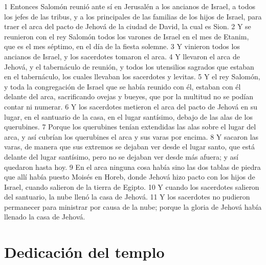 1 Entonces Salomón reunió ante sí en Jerusalén a los ancianos de Israel, a todos los jefes de las tribus, y a los principales de las familias de los hijos de Israel, para traer el arca del pacto de Jehová de la ciudad de David, la cual es Sion.
2 Y se reunieron con el rey Salomón todos los varones de Israel en el mes de Etanim, que es el mes séptimo, en el día de la fiesta solemne.
3 Y vinieron todos los ancianos de Israel, y los sacerdotes tomaron el arca.
4 Y llevaron el arca de Jehová, y el tabernáculo de reunión, y todos los utensilios sagrados que estaban en el tabernáculo, los cuales llevaban los sacerdotes y levitas.
5 Y el rey Salomón, y toda la congregación de Israel que se había reunido con él, estaban con él delante del arca, sacrificando ovejas y bueyes, que por la multitud no se podían contar ni numerar.
6 Y los sacerdotes metieron el arca del pacto de Jehová en su lugar, en el santuario de la casa, en el lugar santísimo, debajo de las alas de los querubines. 
7 Porque los querubines tenían extendidas las alas sobre el lugar del arca, y así cubrían los querubines el arca y sus varas por encima.
8 Y sacaron las varas, de manera que sus extremos se dejaban ver desde el lugar santo, que está delante del lugar santísimo, pero no se dejaban ver desde más afuera; y así quedaron hasta hoy.
9 En el arca ninguna cosa había sino las dos tablas de piedra que allí había puesto Moisés en Horeb, donde Jehová hizo pacto con los hijos de Israel, cuando salieron de la tierra de Egipto.
10 Y cuando los sacerdotes salieron del santuario, la nube llenó la casa de Jehová.
11 Y los sacerdotes no pudieron permanecer para ministrar por causa de la nube; porque la gloria de Jehová había llenado la casa de Jehová. 
\section*{Dedicación del templo}

